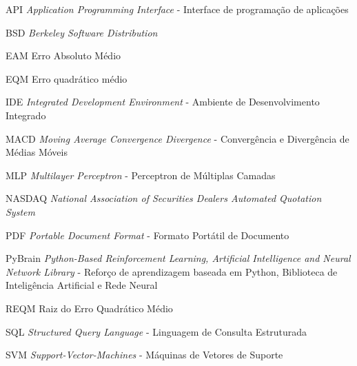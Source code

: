 \begin{siglas}
	\item[API] \textit{Application Programming Interface} - Interface de programação de aplicações
	\item[BSD] \textit{Berkeley Software Distribution}
	\item[EAM] Erro Absoluto Médio
	\item[EQM] Erro quadrático médio
	\item[IDE] \textit{Integrated Development Environment} - Ambiente de Desenvolvimento Integrado
	\item[MACD] \textit{Moving Average Convergence Divergence} - Convergência e Divergência de Médias Móveis
	\item[MLP] \textit{Multilayer Perceptron} - Perceptron de Múltiplas Camadas
	\item[NASDAQ] \textit{National Association of Securities Dealers Automated Quotation System}
	\item[PDF] \textit{Portable Document Format} - Formato Portátil de Documento
	\item[PyBrain] \textit{Python-Based Reinforcement Learning, Artificial Intelligence and Neural Network Library} - Reforço de aprendizagem baseada em Python, Biblioteca de Inteligência Artificial e Rede Neural
	\item[REQM] Raiz do Erro Quadrático Médio
	\item[SQL] \textit{Structured Query Language} - Linguagem de Consulta Estruturada
	\item[SVM] \textit{Support-Vector-Machines } - Máquinas de Vetores de Suporte 
\end{siglas}

